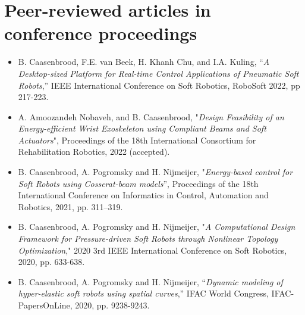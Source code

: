 \section*{Peer-reviewed articles in conference proceedings}
\begin{itemize}[leftmargin=4mm]
\item B. Caasenbrood, F.E. van Beek, H. Khanh Chu, and I.A. Kuling, “\textit{A Desktop-sized Platform for Real-time Control Applications of Pneumatic Soft Robots},” IEEE International Conference on Soft Robotics, RoboSoft 2022, pp 217-223.
\item A. Amoozandeh Nobaveh, and B. Caasenbrood, "\textit{Design Feasibility of an Energy-efficient Wrist Exoskeleton
using Compliant Beams and Soft Actuators}", Proceedings of the 18th International  Consortium for Rehabilitation Robotics, 2022 (accepted).
\item B. Caasenbrood, A. Pogromsky and H. Nijmeijer, "\textit{Energy-based control for Soft Robots using Cosserat-beam models}”, Proceedings of the 18th International Conference on Informatics in Control, Automation and Robotics, 2021, pp. 311–319.
\item B. Caasenbrood, A. Pogromsky and H. Nijmeijer, "\textit{A Computational Design Framework for Pressure-driven Soft Robots through Nonlinear Topology Optimization}," 2020 3rd IEEE International Conference on Soft Robotics, 2020, pp. 633-638.
\item B. Caasenbrood, A. Pogromsky and H. Nijmeijer, “\textit{Dynamic modeling of hyper-elastic soft robots using spatial curves},” IFAC World Congress, IFAC-PapersOnLine, 2020, pp. 9238-9243.
\end{itemize}

